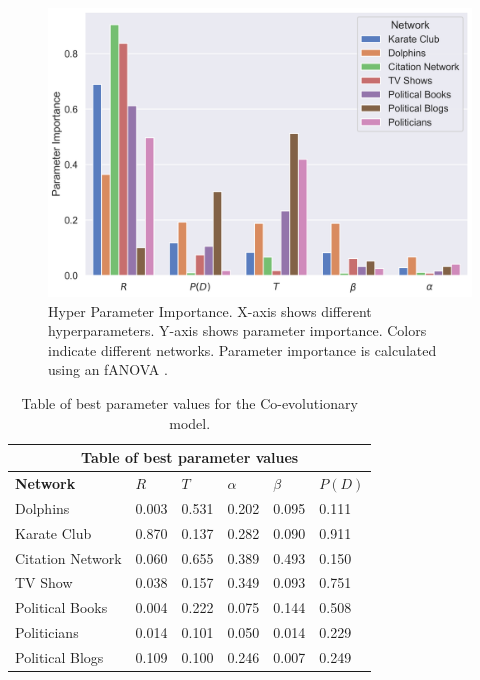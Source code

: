 \documentclass{article}
\begin{document}
\begin{figure}[H]
    \centering
    \includegraphics[width=.8\linewidth]{../plots/overall/Parameter_Importance.png}
  \caption{Hyper Parameter Importance. X-axis shows different hyperparameters. Y-axis shows parameter importance. Colors indicate different networks. Parameter importance is calculated using an fANOVA \protect\cite{hutter2014efficient}.}
  \label{fig:eval_importance}
\end{figure}


\begin{table}[H]
\begin{center}
    
\begin{tabular}{ |p{3cm}||p{2cm}|p{2cm}|p{2cm}|p{2cm}|p{2cm}|}
    \hline
    \multicolumn{6}{|c|}{Table of best parameter values} \\
    \hline
    \bf{Network} & $R$ & $T$ & $\alpha$ & $\beta$ & $P(D)$\\
    \hline
    Dolphins   & 0.003    &0.531&   0.202&   0.095&   0.111\\
    Karate Club&   0.870  & 0.137   &0.282&   0.090&   0.911\\
    Citation Network   &0.060 & 0.655&  0.389&   0.493&   0.150\\
    TV Show & 0.038 & 0.157 & 0.349 & 0.093 & 0.751 \\
    Political Books &0.004 & 0.222&  0.075&   0.144&   0.508\\
    Politicians&   0.014  & 0.101 &0.050&   0.014&   0.229\\
    Political Blogs & 0.109  & 0.100   &0.246&   0.007&   0.249\\
    \hline
\end{tabular}
\end{center}
\caption{Table of best parameter values for the Co-evolutionary model.}
\label{table:best_params}
\end{table}
\end{document}
